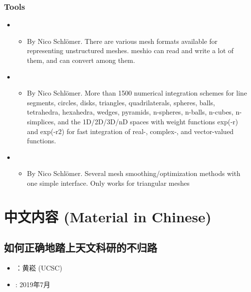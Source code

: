 \documentclass[letterpaper,10pt,english]{sphinxmanual}
\begin{document}
\subsection{Tools}
\label{\detokenize{resource/programing/numerical_method:tools}}\begin{itemize}
\item {} 
\begin{itemize}
\item {} 
By Nico Schlömer. There are various mesh formats available for
representing unstructured meshes. meshio can read and write a lot
of them, and can convert among them.

\end{itemize}

\item {} 
\begin{itemize}
\item {} 
By Nico Schlömer. More than 1500 numerical integration schemes for
line segments, circles, disks, triangles, quadrilaterals, spheres,
balls, tetrahedra, hexahedra, wedges, pyramids, n-spheres,
n-balls, n-cubes, n-simplices, and the 1D/2D/3D/nD spaces with
weight functions exp(-r) and exp(-r2) for fast integration of
real-, complex-, and vector-valued functions.

\end{itemize}

\item {} 
\begin{itemize}
\item {} 
By Nico Schlömer. Several mesh smoothing/optimization methods with
one simple interface. Only works for triangular meshes

\end{itemize}

\end{itemize}


\chapter{中文内容 (Material in Chinese)}
\label{\detokenize{index:material-in-chinese}}

\section{如何正确地踏上天文科研的不归路}
\label{\detokenize{resource/research/getting_started_cn:id1}}\label{\detokenize{resource/research/getting_started_cn::doc}}\begin{itemize}
\item {} 
：黄崧 (UCSC)

\item {} 
: 2019年7月

\end{itemize}
\end{document}
